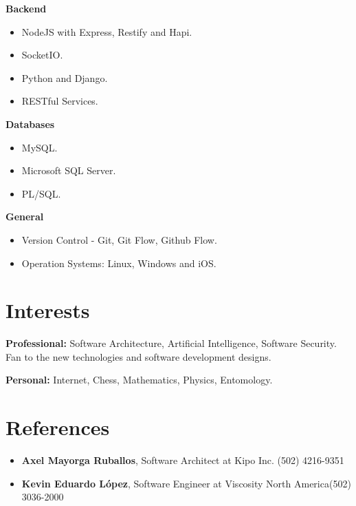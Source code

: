 \documentclass[]{friggeri-cv} %
\begin{document}
\textbf{Backend}
\begin{itemize}
	\item NodeJS with Express, Restify and Hapi.
	\item SocketIO.
	\item Python and Django.
	\item RESTful Services.
\end{itemize}

\textbf{Databases}
\begin{itemize}
	\item MySQL.
	\item Microsoft SQL Server.
	\item PL/SQL.
\end{itemize}

\textbf{General}
\begin{itemize}
	\item Version Control - Git, Git Flow, Github Flow.
	\item Operation Systems: Linux, Windows and iOS.
\end{itemize}


\section{Interests}

\textbf{Professional:} Software Architecture, Artificial Intelligence, Software Security. Fan to the new technologies and software development designs.

\textbf{Personal:} Internet, Chess, Mathematics, Physics, Entomology.

\section{References}

\begin{itemize}
	\item \noindent \textbf{Axel Mayorga Ruballos},  Software Architect at Kipo Inc. \hfill \hfill (502) 4216-9351
	\item \noindent \textbf{Kevin Eduardo López}, Software Engineer at Viscosity North America\hfill \hfill (502) 3036-2000
\end{itemize}
\end{document}

